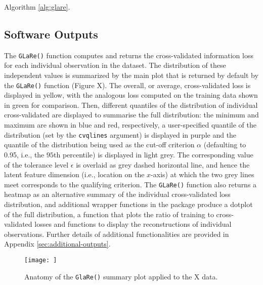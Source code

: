 Algorithm \ref{alg:glare}.

\subsection{Software Outputs}

The \texttt{GLaRe()} function computes and returns the cross-validated information loss for each individual observation in the dataset.
The distribution of these independent values is summarized by the main plot that is returned by default by the \texttt{GLaRe()} function (Figure {\color{red}X}).
The overall, or average, cross-validated loss is displayed in yellow, with the analogous loss computed on the training data shown in green for comparison.
Then, different quantiles of the distribution of individual cross-validated are displayed to summarise the full distribution: the minimum and maximum are shown in blue and red, respectively, a user-specified quantile of the distribution (set by the \texttt{cvqlines} argument) is displayed in purple and the quantile of the distribution being used as the cut-off criterion $\alpha$ (defaulting to 0.95, i.e., the $95$th percentile) is displayed in light grey.
The corresponding value of the tolerance level $\epsilon$ is overlaid as grey dashed horizontal line, and hence the latent feature dimension (i.e., location on the $x$-axis) at which the two grey lines meet corresponds to the qualifying criterion.
The \texttt{GLaRe()} function also returns a heatmap as an alternative summary of the individual cross-validated loss distribution, and additional wrapper functions in the package produce a dotplot of the full distribution, a function that plots the ratio of training to cross-validated losses and functions to display the reconstructions of individual observations. Further details of additional functionalities are provided in Appendix \ref{sec:additional-outputs}.

\begin{figure}
    \centering
    \texttt{[image: ]}
    \caption{Anatomy of the \texttt{GlaRe()} summary plot applied to the {\color{red}X} data.}
    \label{fig:enter-label}
\end{figure}